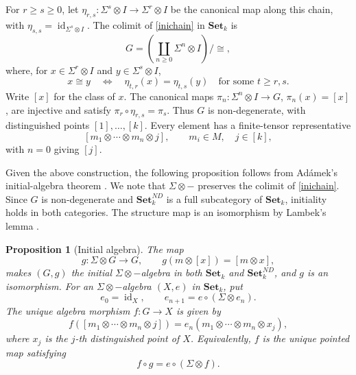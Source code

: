 \documentclass{sn-jnl}%
\theoremstyle{thmstyleone}%
\newtheorem{proposition}[theorem]{Proposition}%
\theoremstyle{thmstyletwo}%
\theoremstyle{thmstylethree}%
\newcommand{\set}{\mathbf{Set}_{k}}
\newcommand{\setnd}{\mathbf{Set}_{k}^{ND}}
\newcommand{\M}{\Sigma}
\newcommand{\F}{\M\otimes}
\newcommand{\Fi}[1]{\M^{#1}\otimes }
\begin{document}
For $r\geq s\geq0$, let $\eta_{r,s}:\Fi{s}I\to\Fi{r}I$ be the canonical map along this chain, with $\eta_{s,s}=\operatorname{id}_{\Fi{s}I}$. The colimit of \eqref{inichain} in $\set$ is 
\begin{equation} 
\nonumber  
    G=\left(\coprod_{n\geq0}\Fi{n}I\right)\big/\cong,
\end{equation}
where, for $x\in\Fi{r}I$ and $y\in\Fi{s}I$,
\begin{equation} 
\nonumber
    x\cong y \quad \Longleftrightarrow \quad \eta_{t,r}(x)=\eta_{t,s}(y) \quad \text{for some } t\geq r,s.
\end{equation}
Write $[x]$ for the class of $x$. The canonical maps $\pi_n:\Fi{n}I\to G$, $\pi_n(x)=[x]$, are injective and satisfy $\pi_r\circ\eta_{r,s}=\pi_s$. Thus $G$ is non-degenerate, with distinguished points $[1],\ldots,[k]$. Every element has a finite-tensor representative 
\begin{equation} 
\nonumber
    [m_1\otimes\cdots\otimes m_n\otimes j],  \qquad m_i\in M,\quad j\in[k],
\end{equation}
with $n=0$ giving $[j]$.

Given the above construction, the following proposition follows from Ad\'amek's initial-algebra theorem \cite{Adamek74}. We note that $\F-$ preserves the colimit of \eqref{inichain}. Since $G$ is non-degenerate and $\setnd$ is a full subcategory of $\set$, initiality holds in both categories. The structure map is an isomorphism by Lambek's lemma \cite{Lam}.

\begin{proposition}[Initial algebra]
\label{Prop_initialAlgebraOnSet}
The map
\begin{equation} 
\nonumber
    g:\F G\longrightarrow G, \qquad g(m\otimes[x])=[m\otimes x],
\end{equation}
makes $(G,g)$ the initial $\F-$algebra in both $\set$ and $\setnd$, and $g$ is an isomorphism. For an $\F-$algebra $(X,e)$ in $\set$, put 
\begin{equation} 
\nonumber
    e_0=\operatorname{id}_X, \qquad e_{n+1}=e\circ(\F e_n).
\end{equation}
The unique algebra morphism $f:G\to X$ is given by 
\begin{equation} 
\nonumber
    f([m_1\otimes\cdots\otimes m_n\otimes j]) = e_n(m_1\otimes\cdots\otimes m_n\otimes x_j),
\end{equation}
where $x_j$ is the $j$-th distinguished point of $X$. Equivalently, $f$ is the unique pointed map satisfying
\begin{equation}
\label{Diag_initialSquare}
    f\circ g=e\circ(\F f).
\end{equation}
\end{proposition}
\end{document}
